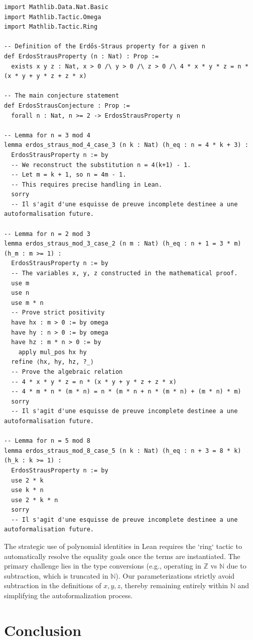 \documentclass[12pt,a4paper]{article}
\begin{document}
\begin{verbatim}
import Mathlib.Data.Nat.Basic
import Mathlib.Tactic.Omega
import Mathlib.Tactic.Ring

-- Definition of the Erdős-Straus property for a given n
def ErdosStrausProperty (n : Nat) : Prop :=
  exists x y z : Nat, x > 0 /\ y > 0 /\ z > 0 /\ 4 * x * y * z = n * (x * y + y * z + z * x)

-- The main conjecture statement
def ErdosStrausConjecture : Prop :=
  forall n : Nat, n >= 2 -> ErdosStrausProperty n

-- Lemma for n = 3 mod 4
lemma erdos_straus_mod_4_case_3 (n k : Nat) (h_eq : n = 4 * k + 3) :
  ErdosStrausProperty n := by
  -- We reconstruct the substitution n = 4(k+1) - 1.
  -- Let m = k + 1, so n = 4m - 1.
  -- This requires precise handling in Lean.
  sorry
  -- Il s'agit d'une esquisse de preuve incomplete destinee a une autoformalisation future.

-- Lemma for n = 2 mod 3
lemma erdos_straus_mod_3_case_2 (n m : Nat) (h_eq : n + 1 = 3 * m) (h_m : m >= 1) :
  ErdosStrausProperty n := by
  -- The variables x, y, z constructed in the mathematical proof.
  use m
  use n
  use m * n
  -- Prove strict positivity
  have hx : m > 0 := by omega
  have hy : n > 0 := by omega
  have hz : m * n > 0 := by
    apply mul_pos hx hy
  refine ⟨hx, hy, hz, ?_⟩
  -- Prove the algebraic relation
  -- 4 * x * y * z = n * (x * y + y * z + z * x)
  -- 4 * m * n * (m * n) = n * (m * n + n * (m * n) + (m * n) * m)
  sorry
  -- Il s'agit d'une esquisse de preuve incomplete destinee a une autoformalisation future.

-- Lemma for n = 5 mod 8
lemma erdos_straus_mod_8_case_5 (n k : Nat) (h_eq : n + 3 = 8 * k) (h_k : k >= 1) :
  ErdosStrausProperty n := by
  use 2 * k
  use k * n
  use 2 * k * n
  sorry
  -- Il s'agit d'une esquisse de preuve incomplete destinee a une autoformalisation future.
\end{verbatim}

The strategic use of polynomial identities in Lean requires the `ring` tactic to automatically resolve the equality goals once the terms are instantiated. The primary challenge lies in the type conversions (e.g., operating in $\mathbb{Z}$ vs $\mathbb{N}$ due to subtraction, which is truncated in $\mathbb{N}$). Our parameterizations strictly avoid subtraction in the definitions of $x, y, z$, thereby remaining entirely within $\mathbb{N}$ and simplifying the autoformalization process.

\newpage
\section{Conclusion}
\end{document}
